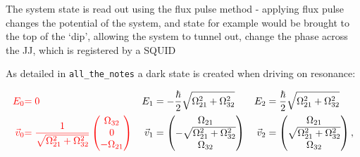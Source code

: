 % 
% 
%   
   The system state is read out using the flux pulse method - applying  flux pulse changes the potential of the system, and state  for example would be brought to the top of the `dip', allowing the system to tunnel out, change the phase across the JJ, which is registered by a SQUID
   
   
   As detailed in \verb|all_the_notes| a dark state is created when driving on resonance:
   
   \begin{equation}
   \begin{aligned}
   {\color{red}{E_0}} &{\color{red}{= 0}} & E_1 &= -\frac{\hbar}{2}\sqrt{\Omega_{21}^2+\Omega_{32}^2} & E_2 &= \frac{\hbar}{2}\sqrt{\Omega_{21}^2+\Omega_{32}^2}\\
   {\color{red}{\vec{v}_0}} & {\color{red}{= \frac{1}{\sqrt{\Omega_{21}^2 + \Omega_{32}^2}}
   	\begin{pmatrix}
   	\Omega_{32}\\0\\-\Omega_{21}
   	\end{pmatrix}}} & 
   \vec{v}_1  & =
   \begin{pmatrix}
   \Omega_{21}\\ -\sqrt{\Omega_{21}^2 + \Omega_{32}^2} \\ \Omega_{32}
   \end{pmatrix} &
   \vec{v}_2  & =
   \begin{pmatrix}
   \Omega_{21}\\ \sqrt{\Omega_{21}^2 + \Omega_{32}^2} \\ \Omega_{32}
   \end{pmatrix},\\
   \end{aligned}
   \end{equation}
 
